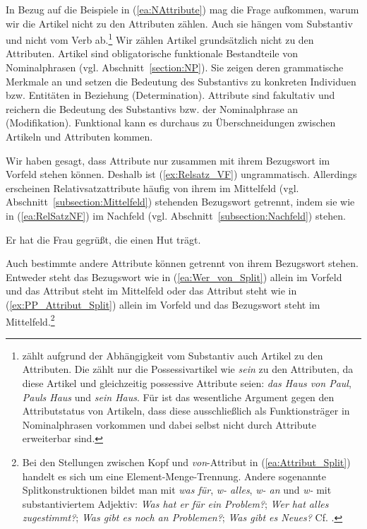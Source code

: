In Bezug auf die Beispiele in (\ref{ea:NAttribute}) mag die Frage aufkommen, warum wir die Artikel nicht zu den Attributen zählen. Auch sie hängen vom Substantiv und nicht vom Verb ab.\footnote{\citet[235]{Engel2011Attribut} zählt aufgrund der Abhängigkeit vom Substantiv auch Artikel zu den Attributen. Die \citet[441, §722]{Duden2022} zählt nur die Possessivartikel wie \textit{sein} zu den Attributen, da diese Artikel und gleichzeitig possessive Attribute seien: \textit{das Haus von Paul}, \textit{Pauls Haus} und  \textit{sein Haus}. Für \citet[321--322]{FuhrhopThierrof2005} ist das wesentliche Argument gegen den Attributstatus von Artikeln, dass diese ausschließlich als Funktionsträger in Nominalphrasen vorkommen und dabei selbst nicht durch Attribute erweiterbar sind.} Wir zählen Artikel grundsätzlich nicht zu den Attributen. Artikel sind obligatorische funktionale Bestandteile von Nominalphrasen (vgl. Abschnitt~\ref{section:NP}). Sie zeigen deren grammatische Merkmale an und setzen die Bedeutung des Substantivs zu konkreten Individuen bzw. Entitäten in Beziehung (Determination). Attribute sind fakultativ und reichern die Bedeutung des Substantivs bzw. der Nominalphrase an (Modifikation). Funktional kann es durchaus zu Überschneidungen zwischen Artikeln und Attributen kommen.

Wir haben gesagt, dass Attribute nur zusammen mit ihrem Bezugswort im Vorfeld stehen können. Deshalb ist (\ref{ex:Relsatz_VF}) ungrammatisch. Allerdings erscheinen Relativsatzattribute häufig von ihrem im Mittelfeld (vgl. Abschnitt~\ref{subsection:Mittelfeld}) stehenden Bezugswort getrennt, indem sie wie in (\ref{ea:RelSatzNF}) im Nachfeld (vgl. Abschnitt~\ref{subsection:Nachfeld}) stehen.

\ea \label{ea:RelSatzNF} Er hat die Frau gegrüßt, die einen Hut trägt.
\z 


Auch bestimmte andere Attribute können getrennt von ihrem Bezugswort stehen. Entweder steht das Bezugswort wie in (\ref{ea:Wer_von_Split}) allein im Vorfeld und das Attribut steht im Mittelfeld oder das Attribut steht wie in (\ref{ex:PP_Attribut_Split}) allein im Vorfeld und das Bezugswort steht im Mittelfeld.\footnote{Bei den Stellungen zwischen Kopf und \textit{von}-Attribut in (\ref{ea:Attribut_Split}) handelt es sich um eine Element-Menge-Trennung. Andere sogenannte Splitkonstruktionen bildet man mit \textit{was für}, \textit{w- alles}, \textit{w- an} und \textit{w-} mit substantiviertem Adjektiv: \textit{Was hat er für ein Problem?}; \textit{Wer hat alles zugestimmt?}; \textit{Was gibt es noch an Problemen?}; \textit{Was gibt es Neues?} Cf. \citet[145--146]{Pafel1995}.}

